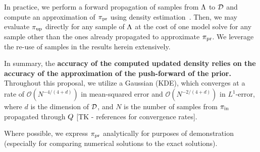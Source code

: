 In practice, we perform a forward propagation of samples from ${\Lambda}$ to $\mathcal{D}$ and compute an approximation of $\operatorname*{\pi_{pr}}$ using density estimation~\cite{BJW18}.
Then, we may evaluate $\operatorname*{\pi_{up}}$ directly for any sample of ${\Lambda}$ at the cost of one model solve for any sample other than the ones already propagated to approximate $\operatorname*{\pi_{pr}}$. 
We leverage the re-use of samples in the results herein extensively.

In summary, the \textbf{accuracy of the computed updated density relies on the accuracy of the approximation of the push-forward of the prior.}
Throughout this proposal, we utilize a Gaussian (KDE), which converges at a rate of $\mathcal{O}(N^{-4/(4+d)})$ in mean-squared error and $\mathcal{O}(N^{-2/(4+d)})$ in $L^1$-error, where $d$ is the dimension of $\mathcal{D}$, and $N$ is the number of samples from $\operatorname*{\pi_{in}}$ propagated through $Q$ [TK - references for convergence rates].

%
%
%


Where possible, we express $\operatorname*{\pi_{pr}}$ analytically for purposes of demonstration (especially for comparing numerical solutions to the exact solutions). 